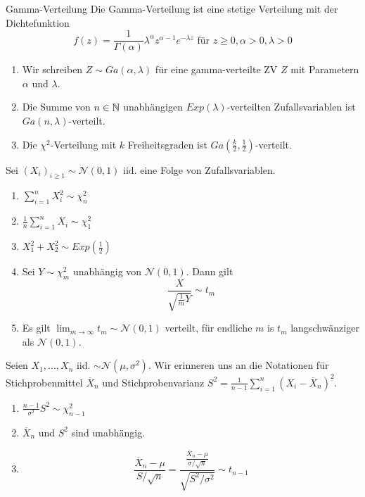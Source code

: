    
\begin{subbox}{Gamma-Verteilung}
  Die Gamma-Verteilung ist eine stetige Verteilung mit der Dichtefunktion
  \[f(z) = \frac{1}{\Gamma(\alpha)}\lambda^{\alpha}z^{\alpha-1}e^{-\lambda z} \text{ für } z \geq 0, \alpha >0, \lambda > 0\]
  \begin{enumerate}
    \item Wir schreiben $Z \sim Ga(\alpha, \lambda)$ für eine gamma-verteilte ZV $Z$ mit Parametern $\alpha$ und $\lambda$.
    \item Die Summe von $n \in \mathbb{N}$ unabhängigen $Exp(\lambda)$-verteilten Zufallsvariablen ist $Ga(n, \lambda)$-verteilt.
    \item Die $\chi^2$-Verteilung mit $k$ Freiheitsgraden ist $Ga\left(\frac{k}{2}, \frac{1}{2}\right)$-verteilt.
  \end{enumerate}
\end{subbox}
Sei $(X_i)_{i \geq 1} \sim \mathcal{N}(0,1)$ iid. eine Folge von Zufallsvariablen.
\begin{enumerate}
  \item $\sum_{i = 1}^{n} X_i^2 \sim \chi^2_n$
  \item $\frac{1}{n}\sum_{i = 1}^n X_i \sim \chi_1^2$
  \item $X_1^2 + X_2^2 \sim Exp\left(\frac{1}{2}\right)$
  \item Sei $Y \sim \chi_m^2$ unabhängig von $\mathcal{N}(0,1)$. Dann gilt \[\frac{X}{\sqrt{\frac{1}{m}Y}} \sim t_m\]
  \item Es gilt $\lim_{m\to\infty} t_m \sim \mathcal{N}(0,1)$ verteilt, für endliche $m$ is $t_m$ langschwänziger als $\mathcal{N}(0,1).$
\end{enumerate}
Seien $X_1, \ldots, X_n$ iid. $\sim \mathcal{N}(\mu, \sigma^2)$.
Wir erinneren uns an die Notationen für Stichprobenmittel $\overline{X}_n$ und Stichprobenvarianz $S^2 = \frac{1}{n-1}\sum_{i = 1}^n(X_i - \overline{X}_n)^2$.
\begin{enumerate}
  \item $\frac{n-1}{\sigma^2}S^2 \sim \chi_{n-1}^2$
  \item $\overline{X}_n$ und $S^2$ sind unabhängig.
  \item \[\frac{\overline{X}_n - \mu}{S/\sqrt{n}} = \frac{\frac{\overline{X}_n - \mu}{\sigma / \sqrt{n}}}{\sqrt{S^2/\sigma^2}} \sim t_{n-1}\]
\end{enumerate}

